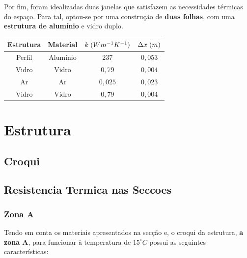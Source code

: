 \documentclass[12pt, a4paper]{article}
\begin{document}
Por fim, foram idealizadas duas janelas que satisfazem as necessidades térmicas do espaço.
Para tal, optou-se por uma construção de \textbf{duas folhas}, com uma \textbf{estrutura de alumínio} e
vidro duplo.
\begin{center}
	\begin{tabular}{||c c c c||}
		\hline
		Estrutura & Material & $k \hspace{1mm} (Wm^{-1}K^{-1})$ & $\Delta x \hspace{1mm} (m)$ \\ [0.5ex]
		\hline\hline
		Perfil    & Alumínio & $237$                            & $0,053$                     \\
		\hline
		Vidro     & Vidro    & $0,79$                           & $0,004$                     \\
		\hline
		Ar        & Ar       & $0,025$                          & $0,023$                     \\
		\hline
		Vidro     & Vidro    & $0,79$                           & $0,004$                     \\
		\hline
	\end{tabular}
\end{center}






\section{Estrutura}\label{sec:Estrutura}


\subsection{Croqui}\label{sub:Croqui}



\subsection{Resistencia Termica nas Seccoes}\label{sub:Resistencia Termica nas Seccoes}

\subsubsection{Zona A}\label{ssub:zonaa}

Tendo em conta os materiais apresentados na secção e, o croqui da estrutura, \textbf{a zona A}, para funcionar
à temperatura de $ 15^\circ C $ possui as seguintes características:
\end{document}
